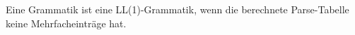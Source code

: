 {\begin{comment}
B &                   &                   &                   &                   &    \\\hline
C &                   &                   &                   &                   &    \\ \hline
\end{array}\]
Ausführung für $B \to \u{b}|\u{q}$ und $C \to A \u{c}$
\[\to \begin{array}{|l|l|l|l|l|l|}
\hline
  & \u{a}             & \u{b}             & \u{c}             & \u{q}             & \$ \\\hline
A & A \to A \u{a}     & A \to \u{b}       & A \to \varepsilon & A \to A \u{a}     & A \to \varepsilon \\
  & A \to A B C       & A \to A \u{a}     &                   & A \to A B C       &    \\
  & A \to \varepsilon & A \to ABC         &                   & A \to \varepsilon &    \\
  &                   & A \to \varepsilon &                   &                   &    \\\hline
B &                   & \color{red}{B \to \u{b}}       &                   & \color{red}{B \to \u{q}}       &    \\\hline
C & \color{red}{C \to A \u{c}}     & \color{red}{C \to A \u{c}}     & \color{red}{C \to A \u{c}}     & \color{red}{C \to A \u{c}}     &    \\ \hline
\end{array}\]
\end{bsp}
\ifthenelse{\boolean{long}}{}{\end{comment}}

\begin{defn}
Eine Grammatik ist eine LL(1)-Grammatik, wenn die berechnete Parse-Tabelle keine Mehrfacheinträge hat.
\end{defn}

